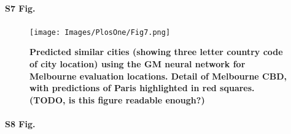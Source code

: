 \documentclass[10pt,letterpaper]{article}
\begin{document}
\paragraph*{S7 Fig.}
\begin{figure}[!htbp]
\centering     
\texttt{[image: Images/PlosOne/Fig7.png]} 
\caption{\bf Predicted similar cities (showing three letter country code of city location) using the GM neural network for Melbourne evaluation locations. Detail of Melbourne CBD, with predictions of Paris highlighted in red squares. (TODO, is this figure readable enough?)}    
 \label{fig:melmapscbd}  
\end{figure} 

\paragraph*{S8 Fig.}
\end{document}
